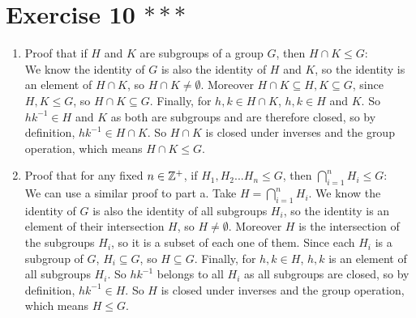 \documentclass[12pt]{article}
\begin{document}
    \section*{Exercise 10 $***$}
    \begin{enumerate}[label=\textbf{\alph*.}]
        \item 
            Proof that if $H$ and $K$ are subgroups of a group $G$,
            then $H \cap K \leqslant G$: \\
            We know the identity of $G$ is also the identity of $H$ and $K$,
            so the identity is an element of $H \cap K$,
            so $H \cap K \neq \emptyset$.
            Moreover $H \cap K \subseteq H, K \subseteq G$,
            since $H, K \leqslant G$,
            so $H \cap K \subseteq G$.
            Finally, for $h, k \in H \cap K$,
            $h, k \in H$ and $K$.
            So $hk^{-1} \in H$ and $K$
            as both are subgroups and are therefore closed,
            so by definition, $hk^{-1} \in H \cap K$.
            So $H \cap K$ is closed under inverses and the group operation,
            which means $H \cap K \leqslant G$.
        \item
            Proof that for any fixed $n \in \mathbb{Z}^+$,
            if $H_1, H_2 ... H_n \leqslant G$,
            then $\bigcap_{i = 1}^n H_i \leqslant G$: \\
            We can use a similar proof to part a.
            Take $H = \bigcap_{i = 1}^n H_i$.
            We know the identity of $G$ is also the identity of all 
            subgroups $H_i$,
            so the identity is an element of their intersection $H$,
            so $H \neq \emptyset$.
            Moreover $H$ is the intersection of the subgroups $H_i$,
            so it is a subset of each one of them.
            Since each $H_i$ is a subgroup of $G$, $H_i\subseteq G$,
            so $H \subseteq G$.
            Finally, for $h, k \in H$,
            $h, k$ is an element of all subgroups $H_i$.
            So $hk^{-1}$ belongs to all $H_i$
            as all subgroups are closed,
            so by definition, $hk^{-1} \in H$.
            So $H$ is closed under inverses and the group operation,
            which means $H \leqslant G$.
    \end{enumerate}
\end{document}
